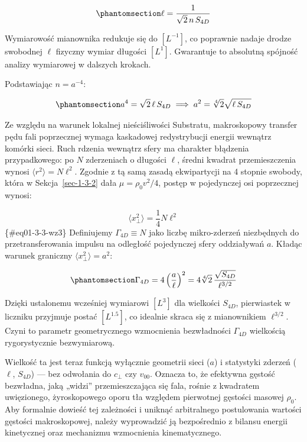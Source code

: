 \documentclass[
  polish,
  letterpaper,
  DIV=11,
  numbers=noendperiod,
  oneside]{scrartcl}
\begin{document}
\begin{equation}\protect\phantomsection\label{eq-1-3-3-wz1}{\ell = \frac{1}{\sqrt{2}\, n\, S_{4D}}}\end{equation}

Wymiarowość mianownika redukuje się do \([L^{-1}]\), co poprawnie nadaje
drodze swobodnej \(\ell\) fizyczny wymiar długości \([L^1]\). Gwarantuje
to absolutną spójność analizy wymiarowej w dalszych krokach.

Podstawiając \(n=a^{-4}\):

\begin{equation}\protect\phantomsection\label{eq-1-3-3-wz2}{a^4 = \sqrt{2}\,\ell\,S_{4D} \implies a^2 = \sqrt[4]{2}\sqrt{\ell\,S_{4D}}}\end{equation}

Ze względu na warunek lokalnej nieściśliwości Substratu, makroskopowy
transfer pędu fali poprzecznej wymaga kaskadowej redystrybucji energii
wewnątrz komórki sieci. Ruch rdzenia wewnątrz sfery ma charakter
błądzenia przypadkowego: po \(N\) zderzeniach o długości \(\ell\),
średni kwadrat przemieszczenia wynosi \(\langle r^2\rangle=N\ell^2\).
Zgodnie z tą samą zasadą ekwipartycji na 4 stopnie swobody, która w
Sekcja~\ref{sec-1-3-2} dała \(\mu=\rho_0v^2/4\), postęp w pojedynczej
osi poprzecznej wynosi:

\[\langle x_{\perp}^2\rangle = \frac14 N\ell^2\] \{\#eq01-3-3-wz3\}
Definiujemy \(\Gamma_{4D}\equiv N\) jako liczbę mikro-zderzeń
niezbędnych do przetransferowania impulsu na odległość pojedynczej sfery
oddziaływań \(a\). Kładąc warunek graniczny
\(\langle x_\perp^2\rangle=a^2\):

\begin{equation}\protect\phantomsection\label{eq-1-3-gamma4d}{\Gamma_{4D} = 4\left(\frac{a}{\ell}\right)^2 = 4\sqrt[4]{2}\,\frac{\sqrt{S_{4D}}}{\ell^{3/2}}}\end{equation}

Dzięki ustalonemu wcześniej wymiarowi \([L^3]\) dla wielkości
\(S_{4D}\), pierwiastek w liczniku przyjmuje postać \([L^{1.5}]\), co
idealnie skraca się z mianownikiem \(\ell^{3/2}\). Czyni to parametr
geometrycznego wzmocnienia bezwładności \(\Gamma_{4D}\) wielkością
rygorystycznie bezwymiarową.

Wielkość ta jest teraz funkcją wyłącznie geometrii sieci (\(a\)) i
statystyki zderzeń (\(\ell\), \(S_{4D}\)) --- bez odwołania do
\(c_\perp\) czy \(v_\text{00}\). Oznacza to, że efektywna gęstość
bezwładna, jaką „widzi'' przemieszczająca się fala, rośnie z kwadratem
uwięzionego, żyroskopowego oporu tła względem pierwotnej gęstości
masowej \(\rho_0\). Aby formalnie dowieść tej zależności i uniknąć
arbitralnego postulowania wartości gęstości makroskopowej, należy
wyprowadzić ją bezpośrednio z bilansu energii kinetycznej oraz
mechanizmu wzmocnienia kinematycznego.
\end{document}

